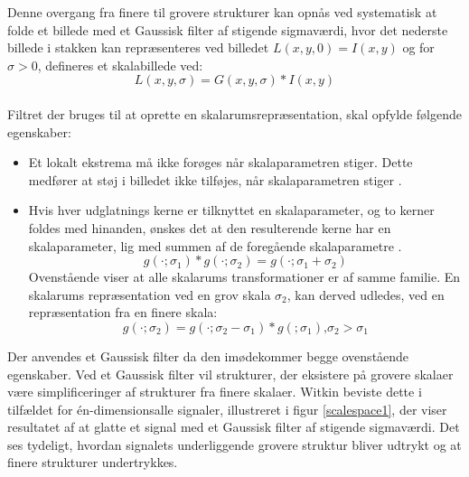 Denne overgang fra finere til grovere strukturer kan opnås ved systematisk at folde et billede med et Gaussisk filter af stigende sigmaværdi, hvor det nederste billede i stakken kan repræsenteres ved billedet $ L(x,y,0) = I(x,y)$ og for $\sigma>0$, defineres et skalabillede ved:
\begin{equation}
L(x,y,\sigma) = G(x,y,\sigma)\ast I(x,y)
\label{scalespace1}
\end{equation}
\\
Filtret der bruges til at oprette en skalarumsrepræsentation, skal opfylde følgende egenskaber:
\begin{itemize}
\item{Et lokalt ekstrema må ikke forøges når skalaparametren stiger. Dette medfører at støj i billedet ikke tilføjes, når skalaparametren stiger \cite{lindkth}.}
\item{Hvis hver udglatnings kerne er tilknyttet en skalaparameter, og to kerner foldes med hinanden, ønskes det at den resulterende kerne har en skalaparameter, lig med summen af de foregående skalaparametre \cite{springer}.
\begin{equation}
g(\cdot;\sigma_1) \ast g(\cdot;\sigma_2)=g(\cdot;\sigma_1+\sigma_2)
\label{semi}
\end{equation}
Ovenstående viser at alle skalarums transformationer er af samme familie. En skalarums repræsentation ved en grov skala $\sigma_2$, kan derved udledes, ved en repræsentation fra en finere skala:
\begin{equation}
g(\cdot;\sigma_2) = g(\cdot;\sigma_2-\sigma_1)\ast g(;\sigma_1)\text{,}\sigma_2>\sigma_1
\end{equation}}
\end{itemize}
Der anvendes et Gaussisk filter da den imødekommer begge ovenstående egenskaber. Ved et Gaussisk filter vil strukturer, der eksistere på grovere skalaer være simplificeringer af strukturer fra finere skalaer. Witkin \cite{witkins} beviste dette i tilfældet for én-dimensionsalle signaler, illustreret i figur \ref{scalespace1}, der viser resultatet af at glatte et signal med et Gaussisk filter af stigende sigmaværdi. Det ses tydeligt, hvordan signalets underliggende grovere struktur bliver udtrykt og at finere strukturer undertrykkes.
